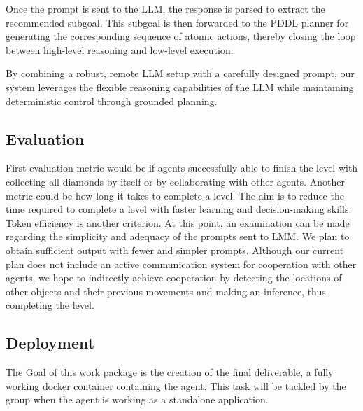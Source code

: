 \documentclass{article}
\begin{document}
Once the prompt is sent to the LLM, the response is parsed to extract the recommended subgoal. This subgoal is then forwarded to the PDDL planner for generating the corresponding sequence of atomic actions, thereby closing the loop between high-level reasoning and low-level execution.

By combining a robust, remote LLM setup with a carefully designed prompt, our system leverages the flexible reasoning capabilities of the LLM while maintaining deterministic control through grounded planning.



\subsection{Evaluation}
First evaluation metric would be if agents successfully able to finish the level with collecting all diamonds by itself or by collaborating with other agents. Another metric could be how long it takes to complete a level. The aim is to reduce the time required to complete a level with faster learning and decision-making skills. Token efficiency is another criterion. At this point, an examination can be made regarding the simplicity and adequacy of the prompts sent to LMM. We plan to obtain sufficient output with fewer and simpler prompts. Although our current plan does not include an active communication system for cooperation with other agents, we hope to indirectly achieve cooperation by detecting the locations of other objects and their previous movements and making an inference, thus completing the level.

\subsection{Deployment}
The Goal of this work package is the creation of the final deliverable, a fully working docker container containing the agent. 
This task will be tackled by the group when the agent is working as a standalone application.
\end{document}
